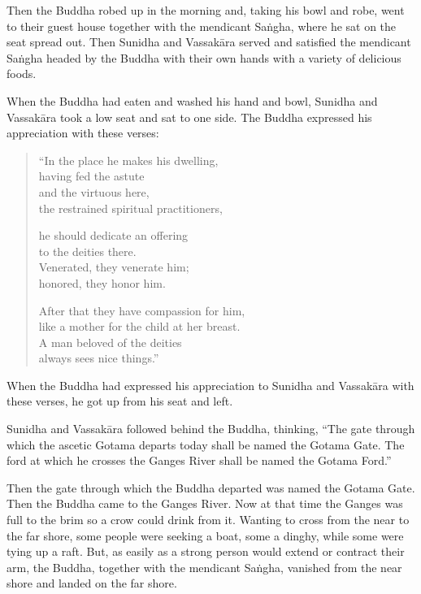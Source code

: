 \documentclass[12pt,openany]{book}%
\begin{document}
Then the Buddha robed up in the morning and, taking his bowl and robe, went to their guest house together with the mendicant \textsanskrit{Saṅgha}, where he sat on the seat spread out. Then Sunidha and \textsanskrit{Vassakāra} served and satisfied the mendicant \textsanskrit{Saṅgha} headed by the Buddha with their own hands with a variety of delicious foods. 

When the Buddha had eaten and washed his hand and bowl, Sunidha and \textsanskrit{Vassakāra} took a low seat and sat to one side. The Buddha expressed his appreciation with these verses: 

\begin{verse}%
“In the place he makes his dwelling, \\
having fed the astute \\
and the virtuous here, \\
the restrained spiritual practitioners, 

he should dedicate an offering \\
to the deities there. \\
Venerated, they venerate him; \\
honored, they honor him. 

After that they have compassion for him, \\
like a mother for the child at her breast. \\
A man beloved of the deities \\
always sees nice things.” 

%
\end{verse}

When the Buddha had expressed his appreciation to Sunidha and \textsanskrit{Vassakāra} with these verses, he got up from his seat and left. 

Sunidha and \textsanskrit{Vassakāra} followed behind the Buddha, thinking, “The gate through which the ascetic Gotama departs today shall be named the Gotama Gate. The ford at which he crosses the Ganges River shall be named the Gotama Ford.” 

Then the gate through which the Buddha departed was named the Gotama Gate. Then the Buddha came to the Ganges River. Now at that time the Ganges was full to the brim so a crow could drink from it. Wanting to cross from the near to the far shore, some people were seeking a boat, some a dinghy, while some were tying up a raft. But, as easily as a strong person would extend or contract their arm, the Buddha, together with the mendicant \textsanskrit{Saṅgha}, vanished from the near shore and landed on the far shore. 
\end{document}

